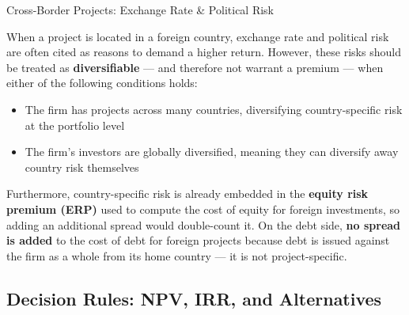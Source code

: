 \documentclass[10pt]{article}
\begin{document}
    \begin{core}{Cross-Border Projects: Exchange Rate \& Political Risk}

      When a project is located in a foreign country, exchange rate and political risk are often cited as reasons to demand a higher return. However, these risks should be treated as \textbf{diversifiable} — and therefore not warrant a premium — when either of the following conditions holds:

      \begin{itemize}

        \item The firm has projects across many countries, diversifying country-specific risk at the portfolio level

        \item The firm's investors are globally diversified, meaning they can diversify away country risk themselves

      \end{itemize}

      Furthermore, country-specific risk is already embedded in the \textbf{equity risk premium (ERP)} used to compute the cost of equity for foreign investments, so adding an additional spread would double-count it. On the debt side, \textbf{no spread is added} to the cost of debt for foreign projects because debt is issued against the firm as a whole from its home country — it is not project-specific.


    \end{core}

  \subsection{Decision Rules: NPV, IRR, and Alternatives}
\end{document}
